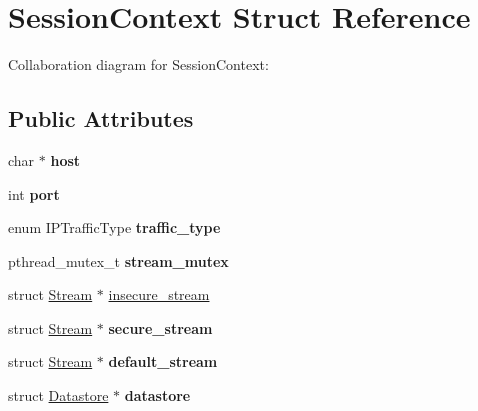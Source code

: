 \hypertarget{struct_session_context}{}\section{Session\+Context Struct Reference}
\label{struct_session_context}


Collaboration diagram for Session\+Context\+:
\subsection*{Public Attributes}
\begin{DoxyCompactItemize}
\item 
\mbox{\label{struct_session_context_a923d6209f5a7789fa257855d9fce60e7}} 
char $\ast$ {\bfseries host}
\item 
\mbox{\label{struct_session_context_aac45aed1f77a0052845308fa42111b40}} 
int {\bfseries port}
\item 
\mbox{\label{struct_session_context_abe39e033aeaad3bf3464bed5666ccc51}} 
enum I\+P\+Traffic\+Type {\bfseries traffic\+\_\+type}
\item 
\mbox{\label{struct_session_context_a24587bb824e17ca408198587ecdf5d9a}} 
pthread\+\_\+mutex\+\_\+t {\bfseries stream\+\_\+mutex}
\item 
struct \mbox{\hyperlink{struct_stream}{Stream}} $\ast$ \mbox{\hyperlink{struct_session_context_ae1f020b11255c67e07b4a082c19d5830}{insecure\+\_\+stream}}
\item 
\mbox{\label{struct_session_context_a4e4938ff0cdc42a56cbf73c764de9993}} 
struct \mbox{\hyperlink{struct_stream}{Stream}} $\ast$ {\bfseries secure\+\_\+stream}
\item 
\mbox{\label{struct_session_context_adbbaf5a9ee36a2bfe886c2ffc32ba317}} 
struct \mbox{\hyperlink{struct_stream}{Stream}} $\ast$ {\bfseries default\+\_\+stream}
\item 
\mbox{\label{struct_session_context_ac0e856ead357b06f6540aa771b2260a6}} 
struct \mbox{\hyperlink{struct_datastore}{Datastore}} $\ast$ {\bfseries datastore}

\end{DoxyCompactItemize}
